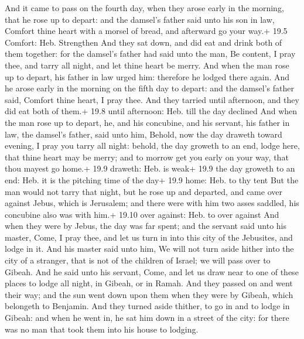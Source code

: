  And it came to pass on the fourth day, when they arose
early in the morning, that he rose up to depart: and the damsel's father
said unto his son in law, Comfort thine heart with a morsel of bread,
and afterward go your way.+ 19.5 Comfort: Heb. Strengthen 
And they sat down, and did eat and drink both of them together: for the
damsel's father had said unto the man, Be content, I pray thee, and
tarry all night, and let thine heart be merry.  And when the
man rose up to depart, his father in law urged him: therefore he lodged
there again.  And he arose early in the morning on the fifth
day to depart: and the damsel's father said, Comfort thine heart, I pray
thee. And they tarried until afternoon, and they did eat both of them.+
19.8 until afternoon: Heb. till the day declined  And when
the man rose up to depart, he, and his concubine, and his servant, his
father in law, the damsel's father, said unto him, Behold, now the day
draweth toward evening, I pray you tarry all night: behold, the day
groweth to an end, lodge here, that thine heart may be merry; and to
morrow get you early on your way, that thou mayest go home.+ 19.9
draweth: Heb. is weak+ 19.9 the day groweth to an end: Heb. it is the
pitching time of the day+ 19.9 home: Heb. to thy tent  But
the man would not tarry that night, but he rose up and departed, and
came over against Jebus, which is Jerusalem; and there were with him two
asses saddled, his concubine also was with him.+ 19.10 over against:
Heb. to over against  And when they were by Jebus, the day
was far spent; and the servant said unto his master, Come, I pray thee,
and let us turn in into this city of the Jebusites, and lodge in it.
 And his master said unto him, We will not turn aside
hither into the city of a stranger, that is not of the children of
Israel; we will pass over to Gibeah.  And he said unto his
servant, Come, and let us draw near to one of these places to lodge all
night, in Gibeah, or in Ramah.  And they passed on and went
their way; and the sun went down upon them when they were by Gibeah,
which belongeth to Benjamin.  And they turned aside
thither, to go in and to lodge in Gibeah: and when he went in, he sat
him down in a street of the city: for there was no man that took them
into his house to lodging.

